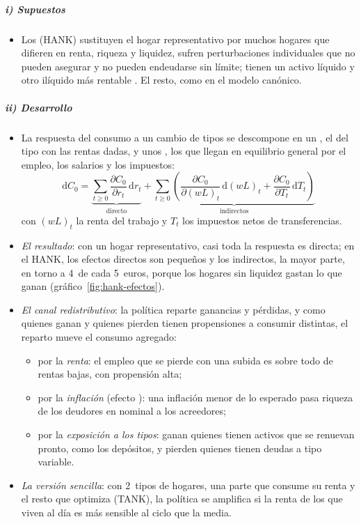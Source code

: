 \documentclass[11pt]{article}
\begin{document}
\subparagraph{i) Supuestos}
\begin{itemize}
\item Los  (HANK) sustituyen el hogar representativo por muchos hogares que difieren en renta, riqueza y liquidez, sufren perturbaciones individuales que no pueden asegurar y no pueden endeudarse sin límite; tienen un activo líquido y otro ilíquido más rentable\nocite{KaplanMollViolante2018Monetary} . El resto, como en el modelo canónico.
\end{itemize}

\subparagraph{ii) Desarrollo}
\begin{itemize}
\item La respuesta del consumo a un cambio de tipos se descompone en un , el del tipo con las rentas dadas, y unos , los que llegan en equilibrio general por el empleo, los salarios y los impuestos:
  \begin{equation}
  \mathrm{d}C_0=\underbrace{\sum_{t\geq0}\frac{\partial C_0}{\partial r_t}\,\mathrm{d}r_t}_{\text{directo}}+\underbrace{\sum_{t\geq0}\left(\frac{\partial C_0}{\partial (wL)_t}\,\mathrm{d}(wL)_t+\frac{\partial C_0}{\partial T_t}\,\mathrm{d}T_t\right)}_{\text{indirectos}} \label{eq:hank}
  \end{equation}
  con $(wL)_t$ la renta del trabajo y $T_t$ los impuestos netos de transferencias.
\item \emph{El resultado}: con un hogar representativo, casi toda la respuesta es directa; en el HANK, los efectos directos son pequeños y los indirectos, la mayor parte, en torno a 4~de cada 5~euros, porque los hogares sin liquidez gastan lo que ganan (gráfico~\ref{fig:hank-efectos})\nocite{KaplanMollViolante2018Monetary}.
\item \emph{El canal redistributivo}: la política reparte ganancias y pérdidas, y como quienes ganan y quienes pierden tienen propensiones a consumir distintas, el reparto mueve el consumo agregado\nocite{Auclert2019Monetary}:
  \begin{itemize}
  \item por la \emph{renta}: el empleo que se pierde con una subida es sobre todo de rentas bajas, con propensión alta;
  \item por la \emph{inflación} (efecto ): una inflación menor de lo esperado pasa riqueza de los deudores en nominal a los acreedores;
  \item por la \emph{exposición a los tipos}: ganan quienes tienen activos que se renuevan pronto, como los depósitos, y pierden quienes tienen deudas a tipo variable.
  \end{itemize}
\item \emph{La versión sencilla}: con 2~tipos de hogares, una parte que consume su renta y el resto que optimiza (TANK), la política se amplifica si la renta de los que viven al día es más sensible al ciclo que la media\nocite{GaliLopezSalidoValles2007,Bilbiie2008Limited,Bilbiie2020New}.
\end{itemize}
\end{document}
